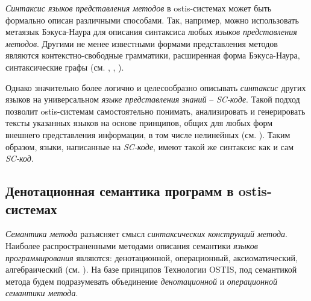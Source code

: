 \textit{Синтаксис языков представления методов} в ostis-системах может быть формально описан различными способами. Так, например, можно использовать метаязык Бэкуса-Наура для описания синтаксиса любых \textit{языков представления методов}. Другими не менее известными формами представления методов являются контекстно-свободные грамматики, расширенная форма Бэкуса-Наура, синтаксические графы (см. , , ).

Однако значительно более логично и целесообразно описывать \textit{синтаксис} других языков на универсальном \textit{языке представления знаний} -- \textit{SC-коде}. Такой подход позволит ostis-системам самостоятельно понимать, анализировать и генерировать тексты указанных языков на основе принципов, общих для любых форм внешнего представления информации, в том числе нелинейных (см. ). Таким образом, языки, написанные на \textit{SC-коде}, имеют такой же синтаксис как и сам \textit{SC-код}.

\subsection{Денотационная семантика программ в ostis-системах}
\label{sec_programs_method_den_semantic}

\textit{Семантика метода} разъясняет смысл \textit{синтаксических конструкций метода}. Наиболее распространенными методами описания семантики \textit{языков программирования} являются: денотационной, операционный, аксиоматический, алгебраический (см. ). На базе принципов Технологии OSTIS, под семантикой метода будем подразумевать объединение \textit{денотационной} и \textit{операционной семантики метода}.

